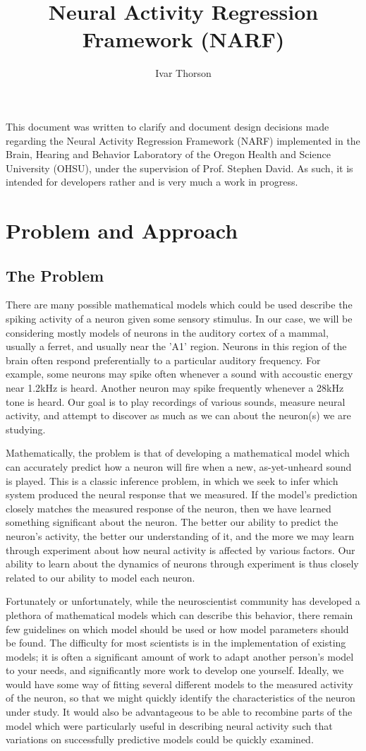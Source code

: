 \documentclass{article}
\title{Neural Activity Regression Framework (NARF)}
\author{Ivar Thorson}
\begin{document}
  
This document was written to clarify and document design decisions made regarding the Neural Activity Regression Framework (NARF) implemented in the Brain, Hearing and Behavior Laboratory of the Oregon Health and Science University (OHSU), under the supervision of Prof. Stephen David. As such, it is intended for developers rather and is very much a work in progress. 

\section{Problem and Approach}

\subsection{The Problem}

There are many possible mathematical models which could be used describe the spiking activity of a neuron given some sensory stimulus. In our case, we will be considering mostly models of neurons in the auditory cortex of a mammal, usually a ferret, and usually near the 'A1' region. Neurons in this region of the brain often respond preferentially to a particular auditory frequency. For example, some neurons may spike often whenever a sound with accoustic energy near 1.2kHz is heard. Another neuron may spike frequently whenever a 28kHz tone is heard. Our goal is to play recordings of various sounds, measure neural activity, and attempt to discover as much as we can about the neuron(s) we are studying.

Mathematically, the problem is that of developing a mathematical model which can accurately predict how a neuron will fire when a new, as-yet-unheard sound is played. This is a classic inference problem, in which we seek to infer which system produced the neural response that we measured. If the model's prediction closely matches the measured response of the neuron, then we have learned something significant about the neuron. The better our ability to predict the neuron's activity, the better our understanding of it, and the more we may learn through experiment about how neural activity is affected by various factors. Our ability to learn about the dynamics of neurons through experiment is thus closely related to our ability to model each neuron.

Fortunately or unfortunately, while the neuroscientist community has developed a plethora of mathematical models which can describe this behavior, there remain few guidelines on which model should be used or how model parameters should be found. The difficulty for most scientists is in the implementation of existing models; it is often a significant amount of work to adapt another person's model to your needs, and significantly more work to develop one yourself. Ideally, we would have some way of fitting several different models to the measured activity of the neuron, so that we might quickly identify the characteristics of the neuron under study. It would also be advantageous to be able to recombine parts of the model which were particularly useful in describing neural activity such that variations on successfully predictive models could be quickly examined. 
\end{document}
